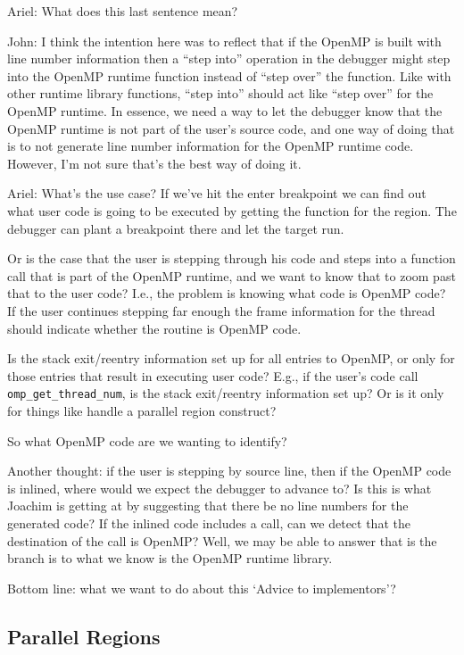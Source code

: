 \begin{notes}
Ariel: What does this last sentence mean?

John: I think the intention here was to reflect that if the OpenMP
is built with line number information then a ``step into'' operation
in the debugger might step into the OpenMP runtime function
instead of ``step over'' the function.
Like with other runtime library functions, ``step into'' should act like
``step over'' for the OpenMP runtime.
In essence, we need a way to let the debugger know that the OpenMP runtime
is not part of the user's source code, and one way of doing that is to
not generate line number information for the OpenMP runtime code.
However, I'm not sure that's the best way of doing it.

Ariel:
What's the use case?
If we've hit the enter breakpoint we can find out what user code
is going to be executed by getting the function for the region.
The debugger can plant a breakpoint there and let the target run.

Or is the case that the user is stepping through his code and
steps into a function call that is part of the OpenMP runtime,
and we want to know that to zoom past that to the user code?
I.e., the problem is knowing what code is OpenMP code?
If the user continues stepping far enough the frame information for the thread
should indicate whether the routine is OpenMP code.

Is the stack exit/reentry information set up for all entries to OpenMP,
or only for those entries that result in executing user code?
E.g., if the user's code call \texttt{omp\_get\_thread\_num},
is the stack exit/reentry information set up?  Or is it only for
things like handle a parallel region construct?

So what OpenMP code are we wanting to identify?

Another thought:
if the user is stepping by source line, then if the OpenMP code is inlined,
where would we expect the debugger to advance to?
Is this is what Joachim is getting at by suggesting that there be
no line numbers for the generated code?
If the inlined code includes a call, can we detect
that the destination of the call is OpenMP?
Well, we may be able to answer that is the branch is to what we
know is the OpenMP runtime library.

Bottom line: what we want to do about this `Advice to implementors'?

\end{notes}

\subsection{Parallel Regions}

